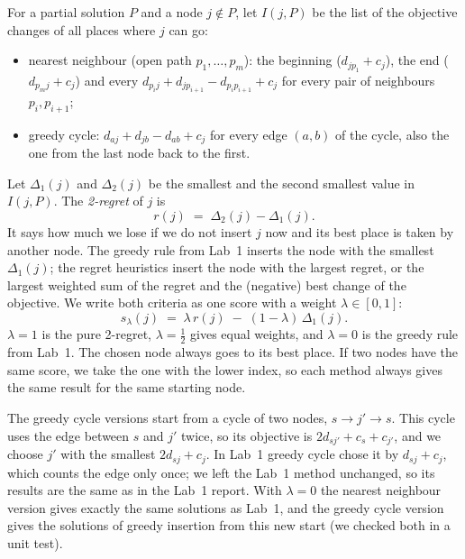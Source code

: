 \documentclass[11pt,a4paper]{article}
\begin{document}
For a partial solution $P$ and a node $j \notin P$, let $I(j, P)$ be the list
of the objective changes of all places where $j$ can go:
\begin{itemize}
  \item nearest neighbour (open path $p_1, \dots, p_m$): the beginning
        ($d_{j p_1} + c_j$), the end ($d_{p_m j} + c_j$) and every
        $d_{p_i j} + d_{j p_{i+1}} - d_{p_i p_{i+1}} + c_j$ for every pair of neighbours
        $p_i, p_{i+1}$;
  \item greedy cycle: $d_{aj} + d_{jb} - d_{ab} + c_j$ for every edge $(a, b)$ of the cycle,
        also the one from the last node back to the first.
\end{itemize}
Let $\Delta_1(j)$ and $\Delta_2(j)$ be the smallest and the second smallest
value in $I(j, P)$. The \emph{2-regret} of $j$ is
\[
  r(j) \;=\; \Delta_2(j) - \Delta_1(j) .
\]
It says how much we lose if we do not insert $j$ now and its best place is
taken by another node. The greedy rule from Lab~1 inserts the node with the
smallest $\Delta_1(j)$; the regret heuristics insert the node with the largest
regret, or the largest weighted sum of the regret and the (negative) best
change of the objective. We write both criteria as one score with a weight
$\lambda \in [0, 1]$:
\[
  s_\lambda(j) \;=\; \lambda\, r(j) \;-\; (1 - \lambda)\, \Delta_1(j) .
\]
$\lambda = 1$ is the pure 2-regret, $\lambda = \tfrac12$ gives equal weights,
and $\lambda = 0$ is the greedy rule from Lab~1. The chosen node always goes to
its best place. If two nodes have the same score, we take the one with the
lower index, so each method always gives the same result for the same starting
node.

The greedy cycle versions start from a cycle of two nodes, $s \to j' \to s$.
This cycle uses the edge between $s$ and $j'$ twice, so its objective is
$2 d_{sj'} + c_s + c_{j'}$, and we choose $j'$ with the smallest
$2 d_{sj} + c_j$. In Lab~1 greedy cycle chose it by $d_{sj} + c_j$, which
counts the edge only once; we left the Lab~1 method unchanged, so its results
are the same as in the Lab~1 report. With $\lambda = 0$ the nearest neighbour
version gives exactly the same solutions as Lab~1, and the greedy cycle
version gives the solutions of greedy insertion from this new start (we
checked both in a unit test).
\end{document}
